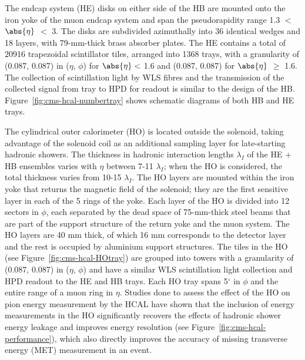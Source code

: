 The endcap system (HE) disks on either side of the HB are mounted onto the iron yoke of the muon endcap system and span the pseudorapidity range 1.3 $<$ $\abs{\eta}$ $<$ 3. The disks are subdivided azimuthally into 36 identical wedges and 18 layers, with 79-mm-thick brass absorber plates. The HE contains a total of 20916 trapezoidal scintillator tiles, arranged into 1368 trays, with a granularity of (0.087, 0.087) in ($\eta$, $\phi$) for $\abs{\eta} <$ 1.6 and (0.087, 0.087) for $\abs{\eta}$ $\geq$ 1.6. The collection of scintillation light by WLS fibres and the transmission of the collected signal from tray to HPD for readout is similar to the design of the HB. Figure~\ref{fig:cms-hcal-numbertray} shows schematic diagrams of both HB and HE trays.

The cylindrical outer calorimeter (HO) is located outside the solenoid, taking advantage of the solenoid coil as an additional sampling layer for late-starting hadronic showers. The thickness in hadronic interaction lengths $\lambda_I$ of the HE + HB ensembles varies with $\eta$ between 7-11 $\lambda_I$; when the HO is considered, the total thickness varies from 10-15 $\lambda_I$. The HO layers are mounted within the iron yoke that returns the magnetic field of the solenoid; they are the first sensitive layer in each of the 5 rings of the yoke. Each layer of the HO is divided into 12 sectors in $\phi$, each separated by the dead space of 75-mm-thick steel beams that are part of the support structure of the return yoke and the muon system. The HO layers are 40 mm thick, of which 16 mm corresponds to the detector layer and the rest is occupied by aluminium support structures. The tiles in the HO (see Figure~\ref{fig:cms-hcal-HOtray}) are grouped into towers with a granularity of (0.087, 0.087) in ($\eta$, $\phi$) and have a similar WLS scintillation light collection and HPD readout to the HE and HB trays. Each HO tray spans 5$^{\circ}$ in $\phi$ and the entire range of a muon ring in $\eta$. Studies done to assess the effect of the HO on pion energy measurement by the HCAL have shown that the inclusion of energy measurements in the HO significantly recovers the effects of hadronic shower energy leakage and improves energy resolution (see Figure~\ref{fig:cms-hcal-performance}), which also directly improves the accuracy of missing transverse energy (MET) measurement in an event.

